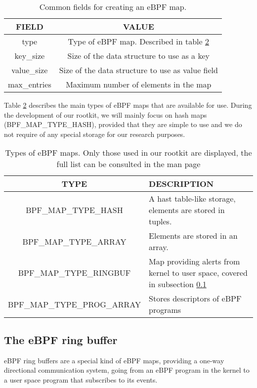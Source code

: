 \begin{table}[htbp]
\begin{tabular}{|c|c|}
\hline
FIELD & VALUE\\
\hline
type & Type of eBPF map. Described in table \ref{table:ebpf_map_types}\\
key\_size & Size of the data structure to use as a key\\
value\_size & Size of the data structure to use as value field\\
max\_entries & Maximum number of elements in the map\\
\hline
\end{tabular}
\caption{Common fields for creating an eBPF map.}
\label{table:ebpf_map_struct}
\end{table}

Table \ref{table:ebpf_map_types} describes the main types of eBPF maps that are available for use. During the development of our rootkit, we will mainly focus on hash maps (BPF\_MAP\_TYPE\_HASH), provided that they are simple to use and we do not require of any special storage for our research purposes.

\begin{table}[htbp]
\begin{tabular}{|c|>{\centering\arraybackslash}p{10cm}|}
\hline
TYPE & DESCRIPTION\\
\hline
BPF\_MAP\_TYPE\_HASH & A hast table-like storage, elements are stored in tuples.\\
BPF\_MAP\_TYPE\_ARRAY & Elements are stored in an array.\\
BPF\_MAP\_TYPE\_RINGBUF & Map providing alerts from kernel to user space, covered in subsection \ref{subsection:bpf_ring_buf}\\
BPF\_MAP\_TYPE\_PROG\_ARRAY & Stores descriptors of eBPF programs\\
\hline
\hline
\end{tabular}
\caption{Types of eBPF maps. Only those used in our rootkit are displayed, the full list can be consulted in the man page \cite{bpf_syscall}}
\label{table:ebpf_map_types}
\end{table}

\subsection{The eBPF ring buffer} \label{subsection:bpf_ring_buf}
eBPF ring buffers are a special kind of eBPF maps, providing a one-way directional communication system, going from an eBPF program in the kernel to a user space program that subscribes to its events.

